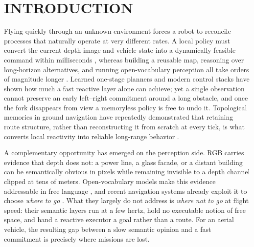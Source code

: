 \documentclass[letterpaper,10pt,conference]{ieeeconf}
\begin{document}
\section{INTRODUCTION}
Flying quickly through an unknown environment forces a robot to reconcile
processes that naturally operate at very different rates.  A local policy must
convert the current depth image and vehicle state into a dynamically feasible
command within milliseconds
\cite{rappids,nanomap,egoplanner,yopo,loquercio}, whereas building a reusable
map, reasoning over long-horizon alternatives, and running open-vocabulary
perception all take orders of magnitude longer
\cite{octomap,voxblox,clip}.  Learned one-stage planners
\cite{yopo,loquercio} and modern control stacks \cite{kaufmann2023} have shown
how much a fast reactive layer alone can achieve; yet a single observation
cannot preserve an early left--right commitment around a long obstacle, and
once the fork disappears from view a memoryless policy is free to undo it.
Topological memories in ground navigation have repeatedly demonstrated that
retaining route structure, rather than reconstructing it from scratch at every
tick, is what converts local reactivity into reliable long-range behavior
\cite{sptm,ving,viking,vint}.

A complementary opportunity has emerged on the perception side.  RGB carries
evidence that depth does not: a power line, a glass facade, or a distant
building can be semantically obvious in pixels while remaining invisible to a
depth channel clipped at tens of meters.  Open-vocabulary models make this
evidence addressable in free language
\cite{clip,lseg,openseg,pearl}, and recent navigation systems already exploit
it to choose \emph{where to go} \cite{vlfm,lmnav,semexp,rayfronts,wildos}.
What they largely do not address is \emph{where not to go} at flight speed:
their semantic layers run at a few hertz, hold no executable notion of free
space, and hand a reactive executor a goal rather than a route.  For an aerial
vehicle, the resulting gap between a slow semantic opinion and a fast
commitment is precisely where missions are lost.
\end{document}
